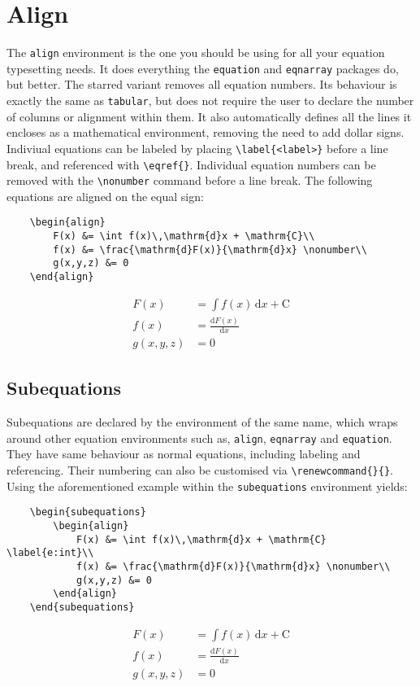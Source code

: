 \section{Align}
%
The \verb|align| environment is the one you should be using for all your equation typesetting needs. It does everything the \verb|equation| and \verb|eqnarray| packages do, but better. The starred variant removes all equation numbers. Its behaviour is exactly the same as \verb|tabular|, but does not require the user to declare the number of columns or alignment within them. It also automatically defines all the lines it encloses as a mathematical environment, removing the need to add dollar signs. Indiviual equations can be labeled by placing \verb|\label{<label>}| before a line break, and referenced with \verb|\eqref{}|. Individual equation numbers can be removed with the \verb|\nonumber| command before a line break. The following equations are aligned on the equal sign:
\begin{verbatim}
	\begin{align}
	    F(x) &= \int f(x)\,\mathrm{d}x + \mathrm{C}\\
	    f(x) &= \frac{\mathrm{d}F(x)}{\mathrm{d}x} \nonumber\\
	    g(x,y,z) &= 0
	\end{align}
\end{verbatim}
\begin{align}
    F(x) &= \int f(x)\,\mathrm{d}x + \mathrm{C}\\
    f(x) &= \frac{\mathrm{d}F(x)}{\mathrm{d}x} \nonumber\\
    g(x,y,z) &= 0
\end{align}
%
\subsection{Subequations}
%
Subequations are declared by the environment of the same name, which wraps around other equation environments such as, \verb|align|, \verb|eqnarray| and \verb|equation|. They have same behaviour as normal equations, including labeling and referencing. Their numbering can also be customised via \verb|\renewcommand{}{}|. Using the aforementioned example within the \verb|subequations| environment yields:
\begin{verbatim}
	\begin{subequations}
	    \begin{align}
	        F(x) &= \int f(x)\,\mathrm{d}x + \mathrm{C} \label{e:int}\\
	        f(x) &= \frac{\mathrm{d}F(x)}{\mathrm{d}x} \nonumber\\
	        g(x,y,z) &= 0
	    \end{align}
	\end{subequations}
\end{verbatim}
\begin{subequations}
	\begin{align}
        F(x) &= \int f(x)\,\mathrm{d}x + \mathrm{C} \label{e:int}\\
        f(x) &= \frac{\mathrm{d}F(x)}{\mathrm{d}x} \nonumber\\
        g(x,y,z) &= 0
    \end{align}
\end{subequations}
%
